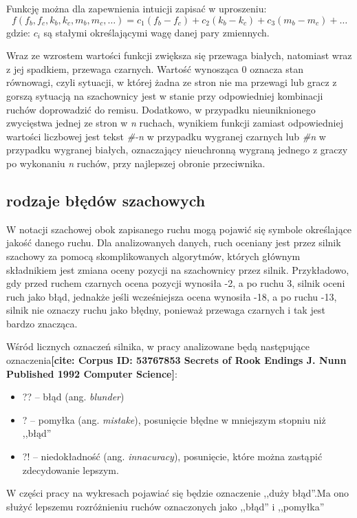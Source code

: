 \documentclass[inzynierska]{pwr_wmat_praca_dyplomowa}
\theoremstyle{plain}
\numberwithin{theorem}{chapter}
\theoremstyle{definition}
\numberwithin{theorem}{chapter}
\begin{document}
Funkcję można dla zapewnienia intuicji zapisać w uproszeniu:
\begin{equation}
	f(f_b,f_c,k_b,k_c,m_b,m_c,\dots)=c_1(f_b-f_c)+c_2(k_b-k_c)+c_3(m_b-m_c)+\dots
\end{equation}
gdzie:
$c_i$ są stałymi określającymi wagę danej pary zmiennych.

Wraz ze wzrostem wartości funkcji zwiększa się przewaga białych, natomiast wraz z jej spadkiem, przewaga czarnych. Wartość wynosząca 0 oznacza stan równowagi, czyli sytuacji, w której żadna ze stron nie ma przewagi lub gracz z gorszą sytuacją na szachownicy jest w stanie przy odpowiedniej kombinacji ruchów doprowadzić do remisu. Dodatkowo, w przypadku nieuniknionego zwycięstwa jednej ze stron w \textit{n} ruchach, wynikiem funkcji zamiast odpowiedniej wartości liczbowej jest tekst \textit{\#-n} w przypadku wygranej czarnych lub \textit{\#n} w przypadku wygranej białych, oznaczający nieuchronną wygraną jednego z graczy po wykonaniu \textit{n} ruchów, przy najlepszej obronie przeciwnika.


\subsection{rodzaje błędów szachowych} \label{sec:mysection}


W notacji szachowej obok zapisanego ruchu mogą pojawić się symbole określające jakość danego ruchu. Dla analizowanych danych, ruch oceniany jest przez silnik szachowy za pomocą skomplikowanych algorytmów, których głównym składnikiem jest zmiana oceny pozycji na szachownicy przez silnik.
Przykładowo, gdy przed ruchem czarnych ocena pozycji wynosiła -2, a po ruchu 3, silnik oceni ruch jako błąd, jednakże jeśli wcześniejsza ocena wynosiła -18, a po ruchu -13, silnik nie oznaczy ruchu jako błędny, ponieważ przewaga czarnych i tak jest bardzo znacząca.

Wśród licznych oznaczeń silnika, w pracy analizowane będą następujące oznaczenia\textbf{[cite: Corpus ID: 53767853 Secrets of Rook Endings J. Nunn Published 1992 Computer Science]}:
\begin{itemize}
	\item ??\hphantom{!} -- błąd (ang. \textit{blunder})
	\item ?\hphantom{?!}  -- pomyłka (ang. \textit{mistake}), posunięcie błędne w mniejszym stopniu niż ,,błąd''
	\item ?!\hphantom{?} -- niedokładność  (ang. \textit{innacuracy}), posunięcie, które można zastąpić zdecydowanie lepszym.
\end{itemize}
W części pracy na wykresach pojawiać się będzie oznaczenie ,,duży błąd''.Ma ono służyć lepszemu rozróżnieniu ruchów oznaczonych jako ,,błąd'' i ,,pomyłka''
\end{document}
